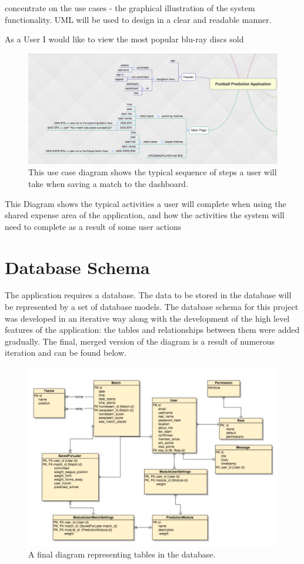 concentrate on the use cases - the graphical illustration of the system functionality. UML will be used to design in a clear and readable manner. 

As a User I would like to view the most popular blu-ray discs sold


\begin{figure}[H]
	\begin{center}
		\includegraphics[width=.90\textwidth]{design/images/mindmap}
		\caption{This use case diagram shows the typical sequence of steps a user will take when saving a match to the dashboard.} \label{fig:using:usecase1}
	\end{center}
\end{figure}
This Diagram shows the typical activities a user will complete when using the shared expense area of the application, and how the activities the system will need to complete as a result of some user actions

\section{Database Schema}
\label{databaseschema_prototype}
The application requires a database. The data to be stored in the database will be represented by a set of database models. The database schema for this project was developed in an iterative way along with the development of the high level features of the application: the tables and relationships between them were added gradually. The final, merged version of the diagram is a result of numerous iteration and can be found below.

\begin{figure}[H]
	\begin{center}
		\includegraphics[width=.90\textwidth]{design/images/database_export.jpg}
		\caption{A final diagram representing tables in the database.}
		\label{fig:using:mindmap}
	\end{center}
\end{figure}
